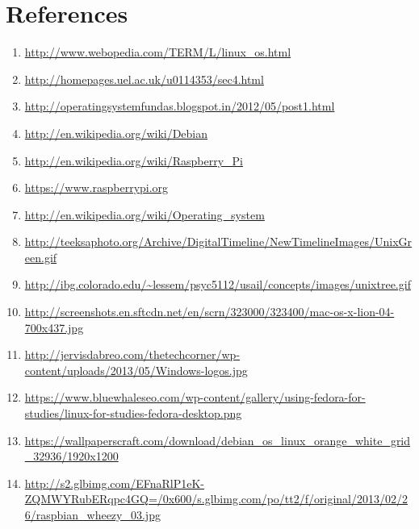 \documentclass[11pt,a4paper]{article}
\begin{document}
	\newpage
	\section{References}
	\begin{enumerate}
		\item \url{http://www.webopedia.com/TERM/L/linux_os.html}
		\item \url{http://homepages.uel.ac.uk/u0114353/sec4.html}
		\item \url{http://operatingsystemfundas.blogspot.in/2012/05/post1.html}
		\item \url{http://en.wikipedia.org/wiki/Debian}
		\item \url{http://en.wikipedia.org/wiki/Raspberry_Pi}
		\item \url{https://www.raspberrypi.org}
		\item \url{http://en.wikipedia.org/wiki/Operating_system}
		\item \url{http://teeksaphoto.org/Archive/DigitalTimeline/NewTimelineImages/UnixGreen.gif}
		\item \url{http://ibg.colorado.edu/~lessem/psyc5112/usail/concepts/images/unixtree.gif}
		\item \url{http://screenshots.en.sftcdn.net/en/scrn/323000/323400/mac-os-x-lion-04-700x437.jpg}
		\item \url{http://jervisdabreo.com/thetechcorner/wp-content/uploads/2013/05/Windows-logos.jpg}
		\item \url{https://www.bluewhaleseo.com/wp-content/gallery/using-fedora-for-studies/linux-for-studies-fedora-desktop.png}
		\item \url{https://wallpaperscraft.com/download/debian_os_linux_orange_white_grid_32936/1920x1200}
		\item \url{http://s2.glbimg.com/EFnaRlP1eK-ZQMWYRubERqpc4GQ=/0x600/s.glbimg.com/po/tt2/f/original/2013/02/26/raspbian_wheezy_03.jpg}
	\end{enumerate}
	
\end{document}

